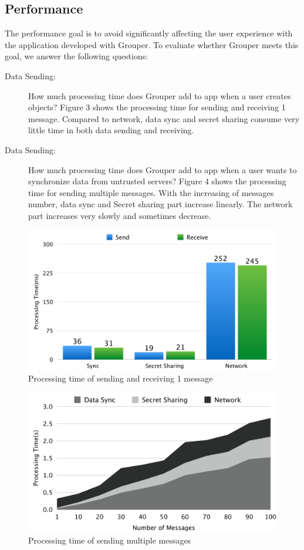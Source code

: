 \documentclass[twocolumn,10pt]{article}
\begin{document}
\subsection{Performance}

The performance goal is to avoid significantly affecting the user experience with the application developed with Grouper. To evaluate whether Grouper meets this goal, we answer the following questions:

\begin{description}
	\item[Data Sending:] How much processing time does Grouper add to app when a user creates objects?
	Figure 3 shows the processing time for sending and receiving 1 message. Compared to network, data sync and secret sharing consume very little time in both data sending and receiving.
	\item[Data Sending:] How much processing time does Grouper add to app when a user wants to synchronize data from untrusted servers?
	Figure 4 shows the processing time for sending multiple messages. With the increasing of messages number, data sync and Secret sharing part increase linearly. The network part increases very slowly and sometimes decrease.
\end{description}

\begin{figure}[!htb]
	\centering
	\includegraphics[scale=0.12]{processing1}
	\caption{Processing time of sending and receiving 1 message}
\end{figure}

\begin{figure}[!htb]
	\centering
	\includegraphics[scale=0.12]{processing2}
	\caption{Processing time of sending multiple messages}
\end{figure}
\end{document}
